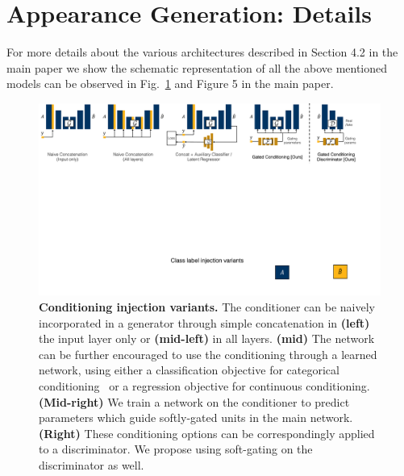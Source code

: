 \documentclass[10pt,twocolumn,letterpaper]{article}
\def\figref#1{Fig.~\ref{#1}}
\begin{document}
\section{Appearance Generation: Details}
For more details about the various architectures described in Section 4.2 in the main paper we show the schematic representation of all the above mentioned models can be observed in \figref{fig:arch-inj} and Figure 5 in the main paper.

\begin{figure}[t]
    \centering
    \includegraphics[width=\linewidth]{paper_images/arch_inject2.pdf}
    \caption{{\bf Conditioning injection variants.}
    The conditioner can be naively incorporated in a generator through simple concatenation in {\bf (left)} the input layer only or {\bf (mid-left)} in all layers. {\bf (mid)} The network can be further encouraged to use the conditioning through a learned network, using either a classification objective for categorical conditioning~\cite{odena2016conditional,chen2016infogan} or a regression objective for continuous conditioning. {\bf (Mid-right)} We train a network on the conditioner to predict parameters which guide softly-gated units in the main network. {\bf (Right)} These conditioning options can be correspondingly applied to a discriminator. We propose using soft-gating on the discriminator as well.\label{fig:arch-inj}
    \vspace{-2mm}
    }
    \vspace{-2mm}
\end{figure}
\end{document}
